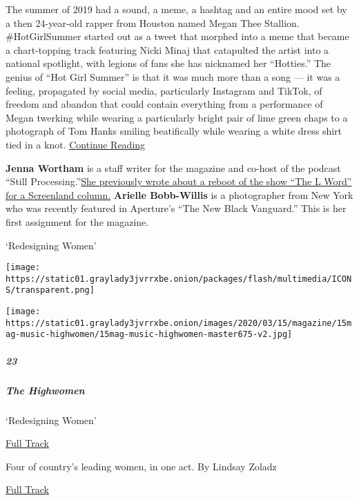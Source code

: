 The summer of 2019 had a sound, a meme, a hashtag and an entire mood set
by a then 24-year-old rapper from Houston named Megan Thee Stallion.
\#HotGirlSummer started out as a tweet that morphed into a meme that
became a chart-topping track featuring Nicki Minaj that catapulted the
artist into a national spotlight, with legions of fans she has nicknamed
her ``Hotties.'' The genius of ``Hot Girl Summer'' is that it was much
more than a song --- it was a feeling, propagated by social media,
particularly Instagram and TikTok, of freedom and abandon that could
contain everything from a performance of Megan twerking while wearing a
particularly bright pair of lime green chaps to a photograph of Tom
Hanks smiling beatifically while wearing a white dress shirt tied in a
knot.
\href{https://www.nytimes3xbfgragh.onion/interactive/2020/03/11/magazine/megan-thee-stallion-interview.html}{Continue
Reading}

\textbf{Jenna Wortham} is a staff writer for the magazine and co-host of
the podcast ``Still
Processing.''\href{https://www.nytimes3xbfgragh.onion/2019/08/28/magazine/how-queer-people-brought-some-actual-reality-to-dating-reality-tv.html}{}\href{https://www.nytimes3xbfgragh.onion/2019/08/28/magazine/how-queer-people-brought-some-actual-reality-to-dating-reality-tv.html}{She
previously wrote about a reboot of the show ``The L Word'' for a
Screenland column.} \textbf{Arielle Bobb-Willis} is a photographer from
New York who was recently featured in Aperture's ``The New Black
Vanguard.'' This is her first assignment for the magazine.

`Redesigning Women'

\texttt{[image: https://static01.graylady3jvrrxbe.onion/packages/flash/multimedia/ICONS/transparent.png]}

\texttt{[image: https://static01.graylady3jvrrxbe.onion/images/2020/03/15/magazine/15mag-music-highwomen/15mag-music-highwomen-master675-v2.jpg]}

\hypertarget{23}{%
\subparagraph{23}\label{23}}

\hypertarget{the-highwomen}{%
\subparagraph{The Highwomen}\label{the-highwomen}}

`Redesigning Women'

\href{https://open.spotify.com/track/31S0wn0oWPO6EVX084IVU1?si=YFLxI794RY2hCnyz-_XfOw}{
Full Track}

Four of country's leading women, in one act. By Lindsay Zoladz

\href{https://open.spotify.com/track/31S0wn0oWPO6EVX084IVU1?si=YFLxI794RY2hCnyz-_XfOw}{Full
Track }

